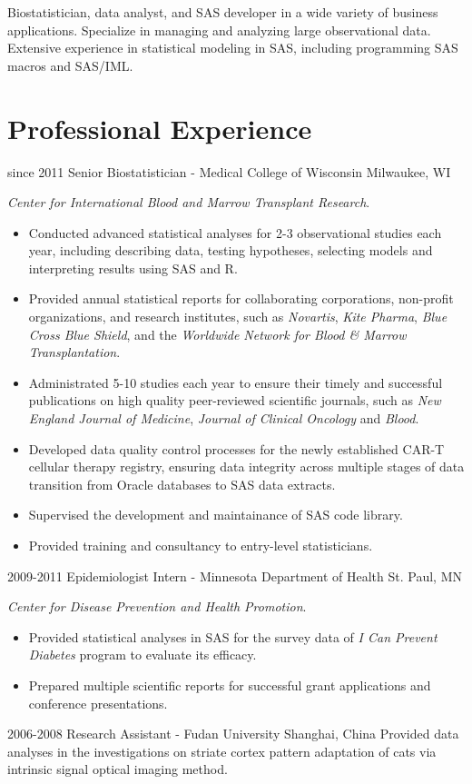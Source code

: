 Biostatistician, data analyst, and SAS developer in a wide variety of business applications. Specialize in managing and analyzing large observational data. Extensive experience in statistical modeling in SAS, including programming SAS macros and SAS/IML.\\

\section{Professional Experience}

\begin{entrylist}
  \entry
    {since 2011}
    {Senior Biostatistician - Medical College of Wisconsin}
    {Milwaukee, WI}
    {
    \textit{Center for International Blood and Marrow Transplant Research}.
    \begin{itemize}
      \item Conducted advanced statistical analyses for 2-3 observational studies each year, including describing data, testing hypotheses, selecting models and interpreting results using SAS and R.
      \item Provided annual statistical reports for collaborating corporations, non-profit organizations, and research institutes, such as \textit{Novartis}, \textit{Kite Pharma}, \textit{Blue Cross Blue Shield}, and the \textit{Worldwide Network for Blood \& Marrow Transplantation}.
      \item Administrated 5-10 studies each year to ensure their timely and successful publications on high quality peer-reviewed scientific journals, such as \textit{New England Journal of Medicine}, \textit{Journal of Clinical Oncology} and \textit{Blood}.
      \item Developed data quality control processes for the newly established CAR-T cellular therapy registry, ensuring data integrity across multiple stages of data transition from Oracle databases to SAS data extracts.
      \item Supervised the development and maintainance of SAS code library.
      \item Provided training and consultancy to entry-level statisticians.
    \end{itemize}
    }
  \entry
    {2009-2011}
    {Epidemiologist Intern - Minnesota Department of Health}
    {St. Paul, MN}
    {
    \textit{Center for Disease Prevention and Health Promotion}.
    \begin{itemize}
      \item Provided statistical analyses in SAS for the survey data of \textit{I Can Prevent Diabetes} program to evaluate its efficacy.
      \item Prepared multiple scientific reports for successful grant applications and conference presentations.
    \end{itemize}
    }
  \entry
    {2006-2008}
    {Research Assistant - Fudan University}
    {Shanghai, China}
    {Provided data analyses in the investigations on striate cortex pattern adaptation of cats via intrinsic signal optical imaging method.}
\end{entrylist}
